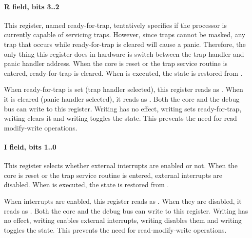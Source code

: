 \paragraph*{R field, bits 3..2}
This register, named ready-for-trap, tentatively specifies if the processor is
currently capable of servicing traps. However, since traps cannot be masked,
any trap that occurs while ready-for-trap is cleared will cause a panic.
Therefore, the only thing this register does in hardware is switch between the
trap handler and panic handler address. When the core is reset or the trap
service routine is entered, ready-for-trap is cleared. When  is
executed, the state is restored from .

When ready-for-trap is set (trap handler selected), this register reads as
. When it is cleared (panic handler selected), it reads as .
Both the core and the debug bus can write to this register. Writing 
has no effect, writing  sets ready-for-trap, writing  clears
it and writing  toggles the state. This prevents the need for
read-modify-write operations.
\paragraph*{I field, bits 1..0}
This register selects whether external interrupts are enabled or not. When the
core is reset or the trap service routine is entered, external interrupts are
disabled. When  is executed, the state is restored from .

When interrupts are enabled, this register reads as . When they are
disabled, it reads as . Both the core and the debug bus can write to
this register. Writing  has no effect, writing  enables
external interrupts, writing  disables them and writing 
toggles the state. This prevents the need for read-modify-write operations.
